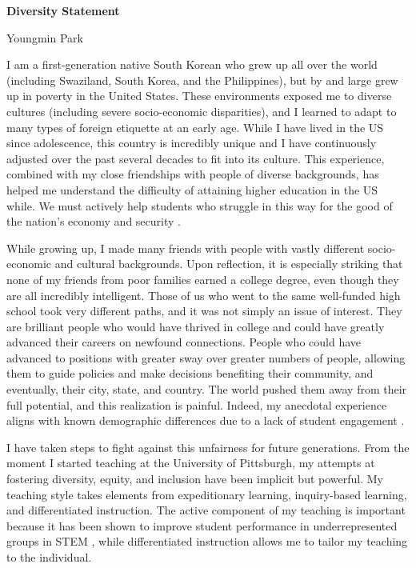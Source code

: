 \documentclass[a4paper,11pt]{article}
\begin{document}
\begin{center}
\Large \textbf{Diversity Statement}

\Large Youngmin Park
\end{center}

I am a first-generation native South Korean who grew up all over the world (including Swaziland, South Korea, and the Philippines), but by and large grew up in poverty in the United States. These environments exposed me to diverse cultures (including severe socio-economic disparities), and I learned to adapt to many types of foreign etiquette at an early age. While I have lived in the US since adolescence, this country is incredibly unique and I have continuously adjusted over the past several decades to fit into its culture. This experience, combined with my close friendships with people of diverse backgrounds, has helped me understand the difficulty of attaining higher education in the US while. We must actively help students who struggle in this way for the good of the nation's economy and security \cite{jones2018call}.

While growing up, I made many friends with people with vastly different socio-economic and cultural backgrounds. Upon reflection, it is especially striking that none of my friends from poor families earned a college degree, even though they are all incredibly intelligent. Those of us who went to the same well-funded high school took very different paths, and it was not simply an issue of interest. They are brilliant people who would have thrived in college and could have greatly advanced their careers on newfound connections. People who could have advanced to positions with greater sway over greater numbers of people, allowing them to guide policies and make decisions benefiting their community, and eventually, their city, state, and country. The world pushed them away from their full potential, and this realization is painful. Indeed, my anecdotal experience aligns with known demographic differences \cite{jones2018call} due to a lack of student engagement \cite{kokkelenberg2010succeeds,savaria2017critical}.

I have taken steps to fight against this unfairness for future generations. From the moment I started teaching at the University of Pittsburgh, my attempts at fostering diversity, equity, and inclusion have been implicit but powerful. My teaching style takes elements from expeditionary learning, inquiry-based learning, and differentiated instruction. The active component of my teaching is important because it has been shown to improve student performance in underrepresented groups in STEM \cite{theobald2020active}, while differentiated instruction allows me to tailor my teaching to the individual.
\end{document}
